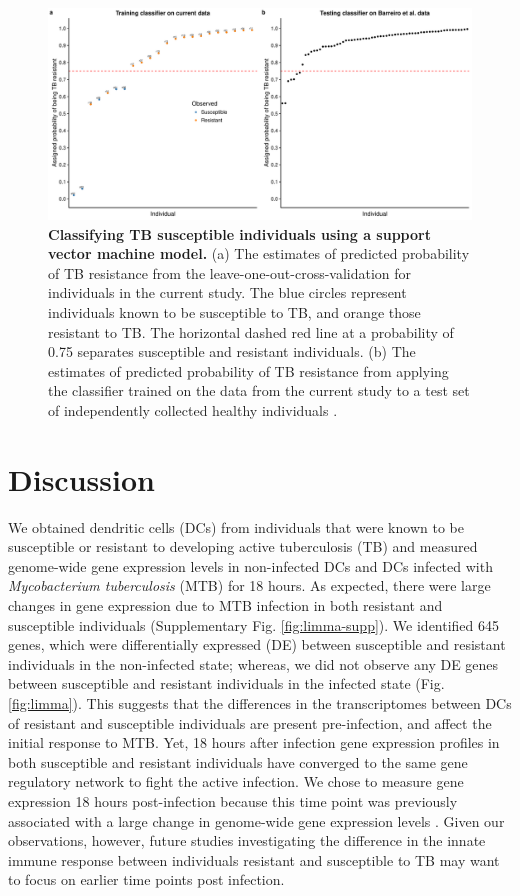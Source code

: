 \begin{figure}
\centering \includegraphics[width=5in]{img/ch03/classifier-svm.pdf}
\caption[Classifying TB susceptible individuals using a support vector
  machine model.]{ \textbf{Classifying TB susceptible individuals
    using a support vector machine model.} (a) The estimates of
  predicted probability of TB resistance from the
  leave-one-out-cross-validation for individuals in the current
  study. The blue circles represent individuals known to be
  susceptible to TB, and orange those resistant to TB. The horizontal
  dashed red line at a probability of 0.75 separates susceptible and
  resistant individuals. (b) The estimates of predicted probability of
  TB resistance from applying the classifier trained on the data from
  the current study to a test set of independently collected healthy
  individuals \citep{Barreiro2012}.  }
\label{fig:classifier}
\end{figure}

\section{Discussion}

We obtained dendritic cells (DCs) from individuals that were known to
be susceptible or resistant to developing active tuberculosis (TB) and
measured genome-wide gene expression levels in non-infected DCs and
DCs infected with \emph{Mycobacterium tuberculosis} (MTB) for 18
hours. As expected, there were large changes in gene expression due to
MTB infection in both resistant and susceptible individuals
(Supplementary Fig. \ref{fig:limma-supp}). We identified 645 genes,
which were differentially expressed (DE) between susceptible and
resistant individuals in the non-infected state; whereas, we did not
observe any DE genes between susceptible and resistant individuals in
the infected state (Fig. \ref{fig:limma}). This suggests that the
differences in the transcriptomes between DCs of resistant and
susceptible individuals are present pre-infection, and affect the
initial response to MTB. Yet, 18 hours after infection gene expression
profiles in both susceptible and resistant individuals have converged
to the same gene regulatory network to fight the active infection. We
chose to measure gene expression 18 hours post-infection because this
time point was previously associated with a large change in
genome-wide gene expression levels \citep{Tailleux2008}. Given our
observations, however, future studies investigating the difference in
the innate immune response between individuals resistant and
susceptible to TB may want to focus on earlier time points post
infection.

